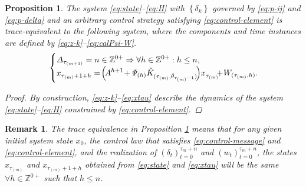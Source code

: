 \documentclass[journal,twoside,web]{ieeecolor}
\newtheorem{remark}{Remark}
\newtheorem{proposition}{Proposition}
\begin{document}
\begin{proposition}\label{prop:equiv}
    The system \eqref{eq:state}–\eqref{eq:H} 
    with $\left\{\delta_{k}\right\}$ governed by \eqref{eq:p-ij} and \eqref{eq:p-delta} and an arbitrary control strategy satisfying %
    \eqref{eq:control-element} is trace-equivalent to the following system, where the components and time instances are defined by \eqref{eq:z-k}–\eqref{eq:calPsi-W}.
    \begin{equation}\label{eq:xtau}
    \text{\small $
    \begin{cases}
        \mathit{\Delta}_{\tau_{(m+1)}} = n \in \mathbb{Z}^{0+}  \Rightarrow  \forall h \in \mathbb{Z}^{0+} : h \leq n, \\
         x_{\tau_{(m)}+1+h}^{} =\! \Big(\!A^{h+1} \!+\! \mathit{\Psi}_{(h)}\hat{K}_{(\tau_{(m)},\hat{\theta}_{\tau_{(m)}-1})}\!\Big)x_{\tau_{(m)}}^{} \!\!\!+\! W_{(\tau_{(m)},h)}.\!\!\!\!\!\!\!
    \end{cases}$}
    \end{equation}
    \begin{proof}
        By construction, \eqref{eq:z-k}–\eqref{eq:xtau} describe the dynamics of the system \eqref{eq:state}–\eqref{eq:H} constrained by %
        \eqref{eq:control-element}.
    \end{proof}
\end{proposition}
\begin{remark}\label{rem:trace-equivalence}
The trace equivalence in Proposition \ref{prop:equiv} means that for any given initial system state $x_{0}$, the control law that satisfies \eqref{eq:control-message} and \eqref{eq:control-element}, and the realization of $\left(\delta_{t}\right)_{t=0}^{\tau_{m}+n}$ and $\left(w_{t}\right)_{t=0}^{\tau_{m}+n}$, the states $x_{\tau_{(m)}}$ and $x_{\tau_{(m)}+1+h}$ obtained from \eqref{eq:state} and \eqref{eq:xtau} will be the same $\forall h\in \mathbb{Z}^{0+}$ such that $h\leq n$. 
\end{remark}
\end{document}
